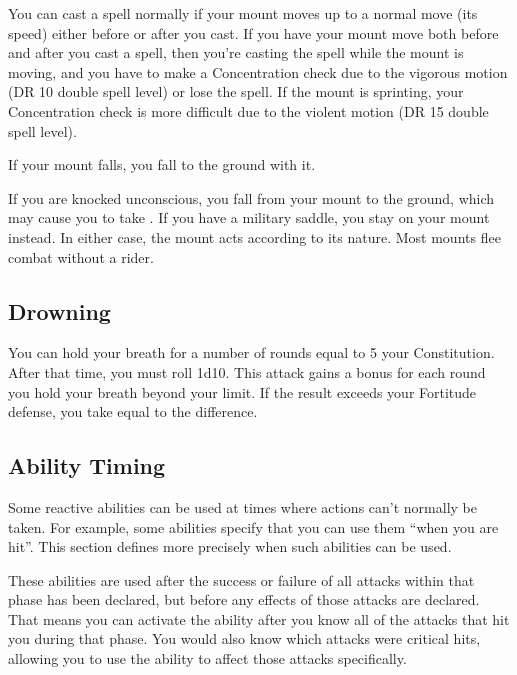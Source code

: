          You can cast a spell normally if your mount moves up to a normal move (its speed) either before or after you cast. If you have your mount move both before and after you cast a spell, then you're casting the spell while the mount is moving, and you have to make a Concentration check due to the vigorous motion (DR 10 \add double spell level) or lose the spell. If the mount is sprinting, your Concentration check is more difficult due to the violent motion (DR 15 \add double spell level).

         If your mount falls, you fall to the ground with it.

         If you are knocked unconscious, you fall from your mount to the ground, which may cause you to take .
        If you have a military saddle, you stay on your mount instead.
        In either case, the mount acts according to its nature.
        Most mounts flee combat without a rider.

    \subsection{Drowning}\label{Drowning}
        You can hold your breath for a number of rounds equal to 5 \add your Constitution.
        After that time, you must roll 1d10.
        This attack gains a  bonus for each round you hold your breath beyond your limit.
        If the result exceeds your Fortitude defense, you take  equal to the difference.

    \subsection{Ability Timing}
        Some reactive abilities can be used at times where actions can't normally be taken.
        For example, some abilities specify that you can use them ``when you are hit''.
        This section defines more precisely when such abilities can be used.

         These abilities are used after the success or failure of all attacks within that phase has been declared, but before any effects of those attacks are declared.
        That means you can activate the ability after you know all of the attacks that hit you during that phase.
        You would also know which attacks were critical hits, allowing you to use the ability to affect those attacks specifically.


